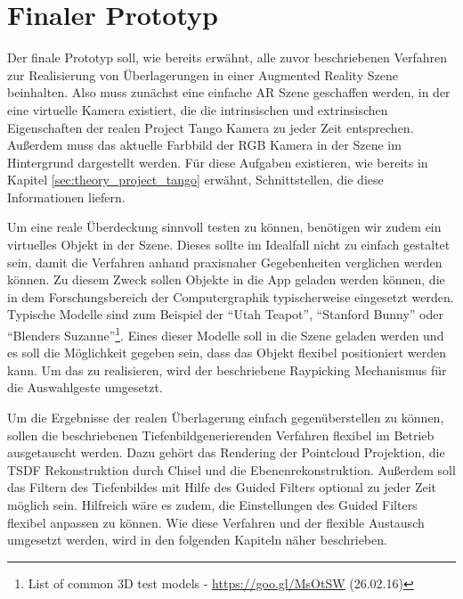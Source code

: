 \section{Finaler Prototyp} \label{sec:final_prototype}

Der finale Prototyp soll, wie bereits erwähnt, alle zuvor beschriebenen Verfahren zur Realisierung von Überlagerungen in einer Augmented Reality Szene beinhalten. Also muss zunächst eine einfache AR Szene geschaffen werden, in der eine virtuelle Kamera existiert, die die intrinsischen und extrinsischen Eigenschaften der realen Project Tango Kamera zu jeder Zeit entsprechen. Außerdem muss das aktuelle Farbbild der RGB Kamera in der Szene im Hintergrund dargestellt werden. Für diese Aufgaben existieren, wie bereits in Kapitel \ref{sec:theory_project_tango} erwähnt, Schnittstellen, die diese Informationen liefern. 

Um eine reale Überdeckung sinnvoll testen zu können, benötigen wir zudem ein virtuelles Objekt in der Szene. Dieses sollte im Idealfall nicht zu einfach gestaltet sein, damit die Verfahren anhand praxisnaher Gegebenheiten verglichen werden können. Zu diesem Zweck sollen Objekte in die App geladen werden können, die in dem Forschungsbereich der Computergraphik typischerweise eingesetzt werden. Typische Modelle sind zum Beispiel der \enquote{Utah Teapot}, \enquote{Stanford Bunny} oder \enquote{Blenders Suzanne}\footnote{List of common 3D test models - \url{https://goo.gl/MsOtSW} (26.02.16)}.  Eines dieser Modelle soll in die Szene geladen werden und es soll die Möglichkeit gegeben sein, dass das Objekt flexibel positioniert werden kann. Um das zu realisieren, wird der beschriebene Raypicking Mechanismus für die Auswahlgeste umgesetzt.

Um die Ergebnisse der realen Überlagerung einfach gegenüberstellen zu können, sollen die beschriebenen Tiefenbild\-generierenden Verfahren flexibel im Betrieb ausgetauscht werden. Dazu gehört das Rendering der Pointcloud Projektion, die TSDF Rekonstruktion durch Chisel und die Ebenenrekonstruktion. Außerdem soll das Filtern des Tiefenbildes mit Hilfe des Guided Filters optional zu jeder Zeit möglich sein. Hilfreich wäre es zudem, die Einstellungen des Guided Filters flexibel anpassen zu können. Wie diese Verfahren und der flexible Austausch umgesetzt werden, wird in den folgenden Kapiteln näher beschrieben.
